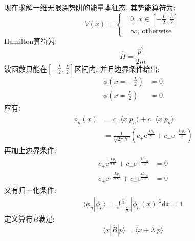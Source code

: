         现在求解一维无限深势阱的能量本征态. 其势能算符为:   
        \begin{equation}
            V(x) = \left \{
                \begin{aligned}
                    &0,\ x\in [-\frac L2, \frac L2 ]\\
                    &\infty, \ \mathrm{otherwise}
                \end{aligned}
                \right.
        \end{equation}
        Hamilton算符为: 
        \begin{equation}
            \hat{H} = \frac {\hat{p}^2}{2m}
        \end{equation}
        波函数只能在$[-\frac L2, \frac L2 ]$区间内, 并且边界条件给出: 
        \begin{equation}\begin{aligned}
            \phi(x = -\frac L2) &= 0\\
            \phi(x = \frac L2) &= 0
        \end{aligned}\end{equation}
        应有:
        \begin{equation}\begin{aligned}
            \phi_n(x) &= c_+ \langle x|p_n\rangle + c_- \langle x|p_n\rangle\\
            &= \frac 1{\sqrt{2\pi \hslash}}(c_+\mathrm{e}^{\frac {\mathrm{i}xp_n}{\hslash}}+c_-\mathrm{e}^{-\frac {\mathrm{i}xp_n}{\hslash}})
        \end{aligned}\end{equation}
        再加上边界条件:
        \begin{equation}\begin{aligned}
            c_+\mathrm{e}^{\frac {\mathrm{i}Lp_n}{2\hslash}}+c_-\mathrm{e}^{-\frac {\mathrm{i}Lp_n}{2\hslash}} &= 0\\
            c_+\mathrm{e}^{-\frac {\mathrm{i}Lp_n}{2\hslash}}+c_-\mathrm{e}^{\frac {\mathrm{i}Lp_n}{2\hslash}} &= 0
        \end{aligned}\end{equation}
        又有归一化条件:
        \begin{equation}\begin{aligned}
            \langle \phi_n | \phi_n \rangle = \int_{-\frac L2}^{\frac L2} |\phi_n(x)|^2 \mathrm{d}x = 1
        \end{aligned}\end{equation}
        定义算符$\hat{B}$满足:
        \[ \langle x|\hat{B}| p \rangle = \langle x+\lambda |p\rangle \]

